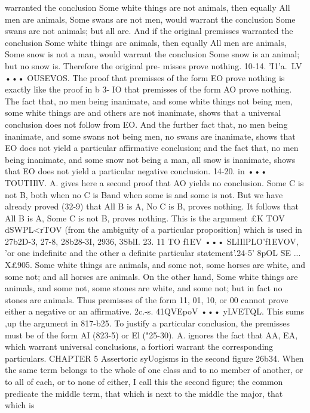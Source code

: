 {{warranted the conclusion Some white things are not animals,
then equally All men are animals, Some swans are not men,
would warrant the conclusion Some swans are not animals; but
all are. And if the original premisses warranted the conclusion
Some white things are animals, then equally All men are animals,
Some snow is not a man, would warrant the conclusion Some
snow is an animal; but no snow is. Therefore the original pre-
misses prove nothing.
10-14. 'I1'a.~LV ••• OUSEVOS. The proof that premisses of the
form EO prove nothing is exactly like the proof in b 3- IO that
premisses of the form AO prove nothing. The fact that, no men
being inanimate, and some white things not being men, some
white things are and others are not inanimate, shows that a
universal conclusion does not follow from EO. And the further
fact that, no men being inanimate, and some swans not being
men, no swans are inanimate, shows that EO does not yield a
particular affirmative conclusion; and the fact that, no men being
inanimate, and some snow not being a man, all snow is inanimate,
shows that EO does not yield a particular negative conclusion.
14-20. in ••• TOUTIIlV. A. gives here a second proof that AO
yields no conclusion. Some C is not B, both when no C is Band
when some is and some is not. But we have already proved
(32-9) that All B is A, No C is B, proves nothing. It follows that
All B is A, Some C is not B, proves nothing. This is the argument
£K TOV dSWPL<rTOV (from the ambiguity of a particular proposition)
which is used in 27b2D-3, 27-8, 28b28-3I, 2936, 3SblI.
23. 11 TO f1EV ••• SLIIlPLO'f1EVOV, 'or one indefinite and the other
a definite particular statement'.24-5' 8pOL SE ... X£905. Some white things are animals, and
some not, some horses are white, and some not; and all horses
are animals. On the other hand, Some white things are animals,
and some not, some stones are white, and some not; but in fact
no stones are animals. Thus premisses of the form 11, 01, 10,
or 00 cannot prove either a negative or an affirmative.
2c.-s. 41QVEpoV ••• yLVETQL. This sums ,up the argument in
817-b25. To justify a particular conclusion, the premisses must
be of the form AI (823-5) or El ("25-30). A. ignores the fact that
AA, EA, which warrant universal conclusions, a fortiori warrant
the corresponding particulars.
CHAPTER 5
Assertoric syUogisms in the second figure
26b34. When the same term belongs to the whole of one class
and to no member of another, or to all of each, or to none of either,
I call this the second figure; the common predicate the middle
term, that which is next to the middle the major, that which is
}}
